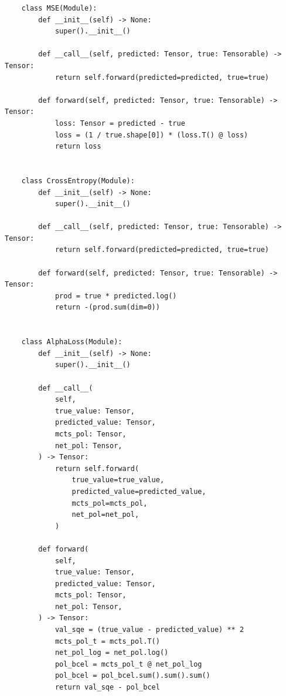 \documentclass{article}
\begin{document}
\begin{verbatim}
    class MSE(Module):
        def __init__(self) -> None:
            super().__init__()

        def __call__(self, predicted: Tensor, true: Tensorable) -> Tensor:
            return self.forward(predicted=predicted, true=true)

        def forward(self, predicted: Tensor, true: Tensorable) -> Tensor:
            loss: Tensor = predicted - true
            loss = (1 / true.shape[0]) * (loss.T() @ loss)
            return loss


    class CrossEntropy(Module):
        def __init__(self) -> None:
            super().__init__()

        def __call__(self, predicted: Tensor, true: Tensorable) -> Tensor:
            return self.forward(predicted=predicted, true=true)

        def forward(self, predicted: Tensor, true: Tensorable) -> Tensor:
            prod = true * predicted.log()
            return -(prod.sum(dim=0))


    class AlphaLoss(Module):
        def __init__(self) -> None:
            super().__init__()

        def __call__(
            self,
            true_value: Tensor,
            predicted_value: Tensor,
            mcts_pol: Tensor,
            net_pol: Tensor,
        ) -> Tensor:
            return self.forward(
                true_value=true_value,
                predicted_value=predicted_value,
                mcts_pol=mcts_pol,
                net_pol=net_pol,
            )

        def forward(
            self,
            true_value: Tensor,
            predicted_value: Tensor,
            mcts_pol: Tensor,
            net_pol: Tensor,
        ) -> Tensor:
            val_sqe = (true_value - predicted_value) ** 2
            mcts_pol_t = mcts_pol.T()
            net_pol_log = net_pol.log()
            pol_bcel = mcts_pol_t @ net_pol_log
            pol_bcel = pol_bcel.sum().sum().sum()
            return val_sqe - pol_bcel

    \end{verbatim}
\end{document}
